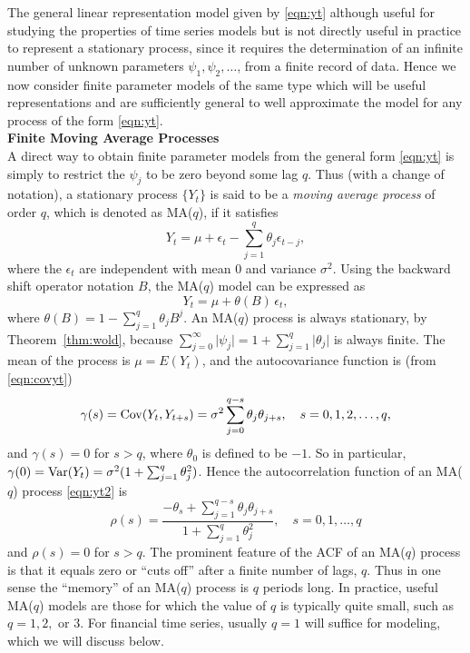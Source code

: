 The general linear representation model given by \eqref{eqn:yt} although useful for studying the properties of time series models but is not directly useful in practice to represent a stationary process, since it requires the determination of an infinite number of unknown parameters $\psi_1, \psi_2, \ldots$, from a finite record of data. Hence we now consider finite parameter models of the same type which will be useful representations and are sufficiently general to well approximate the model for any process of the form \eqref{eqn:yt}. \\


\noindent \textbf{Finite Moving Average Processes} \\


A direct way to obtain finite parameter models from the general form \eqref{eqn:yt} is simply to restrict the $\psi_j$ to be zero beyond some lag $q$. Thus (with a change of notation), a stationary process $\{ Y_t \}$ is said to be a \emph{moving average process} of order $q$, which is denoted as MA($q$), if it satisfies
	\begin{equation} \label{eqn:yt2}
	Y_t = \mu + \epsilon_t - \sum_{j=1}^{q} \theta_j \epsilon_{t-j},
	\end{equation}
where the $\epsilon_t$ are independent with mean 0 and variance $\sigma^2$. Using the backward shift operator notation $B$, the MA($q$) model can be expressed as
	\begin{equation*}
         Y_t= \mu + \theta(B) \, \epsilon_t,	
	\end{equation*}
where $\theta(B) = 1 - \sum_{j=1}^q \theta_j B^j$.  An MA($q$)  process is always stationary, by Theorem~\ref{thm:wold}, because $\sum_{j=0}^{\infty} \lvert \psi_j \rvert= 1 + \sum_{j=1}^q \lvert \theta_j \rvert$ is always finite. The mean of the process is $\mu = E(Y_t)$, and the autocovariance function is (from \eqref{eqn:covyt})
	\begin{equation*}
            \gamma(s)= \operatorname{Cov} (Y_t, Y_{t+s})= \sigma^2 \sum_{j=0}^{q-s} \theta_j \theta_{j+s}, \quad s = 0, 1, 2, \ldots, q,	
	\end{equation*}
and $\gamma(s)= 0$ for $s > q$, where $\theta_0$ is defined to be $-1$. So in particular, $\gamma(0)=  \operatorname{Var}(Y_t) = \sigma^2 (1 + \sum_{j=1}^q \theta_j^2)$. Hence the autocorrelation function of an MA($q$) process \eqref{eqn:yt2} is
       \begin{equation} \label{eqn:rhos}
	\rho(s) = \dfrac{-\theta_s + \sum_{j=1}^{q-s} \theta_j \theta_{j+s}}{1 + \sum_{j=1}^q \theta_j^2}, \quad s = 0,1,\ldots, q
       \end{equation}
and $\rho(s)= 0$ for $s > q$. The prominent feature of the ACF of an MA($q$) process is that it equals zero or ``cuts off'' after a finite number of lags, $q$. Thus in one sense the ``memory'' of an MA($q$) process is $q$ periods long. In practice, useful MA($q$) models are those for which the value of $q$ is typically quite small, such as $q= 1, 2,$ or $3$.  For financial time series, usually $q= 1$ will suffice for modeling, which we will discuss below. 


